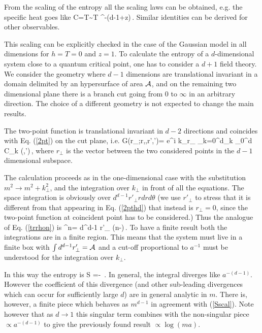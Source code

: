 \documentclass[12pt,aps,nofootinbib]{revtex4-1}
\begin{document}
From the scaling of the entropy all the scaling laws
can be obtained, e.g. the specific heat goes like
\be
C=T\sim T \xi^{-(d-1+z)}\,.
\ee
Similar identities can be derived for other observables.





This scaling can be explicitly checked in the case of the Gaussian
model in all dimensions for $h=T=0$ and $z=1$.
To calculate the entropy of a $d$-dimensional system
close to a quantum critical point, one has to consider a $d+1$ field theory.
We consider the geometry where $d-1$ dimensions are translational invariant
in a domain delimited by an hypersurface of area $\cal A$,
and on the remaining two dimensional plane there is a branch cut going
from 0 to $\infty$ in an arbitrary direction.
The choice of a different geometry is not expected to change the main results.

The two-point function is translational invariant in $d-2$ directions and
coincides with Eq. (\ref{2pt}) on the cut plane, i.e.
\be
G(r_\perp;r,\theta,r',\theta')=
\int {} e^{i k_\perp r_\perp}
 \sum_{k=0}^\infty d_k \int_0^\infty \lambda d\lambda
{}
{\cal C}_k (\theta,\theta')\,,
\label{2pthd}
\ee
where $r_\perp$ is the vector between the two considered points in the
$d-1$ dimensional subspace.

The calculation proceeds as in the one-dimensional case with the substitution
$m^2\rightarrow m^2+k_\perp^2$, and the integration over $k_\perp$ in front
of all the equations. The space integration is obviously over
$d^{d-1}r'_\perp r dr d\theta$ (we use $r'_\perp$ to stress that it is
different from that appearing in Eq. (\ref{2pthd}) that instead is
$r_\perp=0$, since the two-point function at coincident point has to be
considered.)
Thus the analogue of Eq. (\ref{trrhon}) is
\be
{} \rho^n=
\int d^{d-1} r'_\perp \int {}
\left(n-\right)\,.
\ee
To have a finite result both the integrations are in a finite region.
This means that the system must live in a finite box with
$\int d^{d-1} r'_\perp={\cal A}$ and a cut-off proportional to $a^{-1}$
must be understood for the integration over $k_\perp$.


In this way the entropy is
\be
S%
=- \int {}
\log{}\,.
\label{Sd}
\ee
In general, the integral diverges like $a^{-(d-1)}$. However the
coefficient of this divergence (and other sub-leading divergences which
can occur for sufficiently large $d$) are in general analytic in $m$.
There is, however, a finite piece which behaves as $m^{d-1}$ in
agreement with (\ref{Sscal}). Note however that as $d\to1$ this singular
term combines with the non-singular piece $\propto a^{-(d-1)}$ to give
the previously found result $\propto\log(ma)$.
\end{document}
